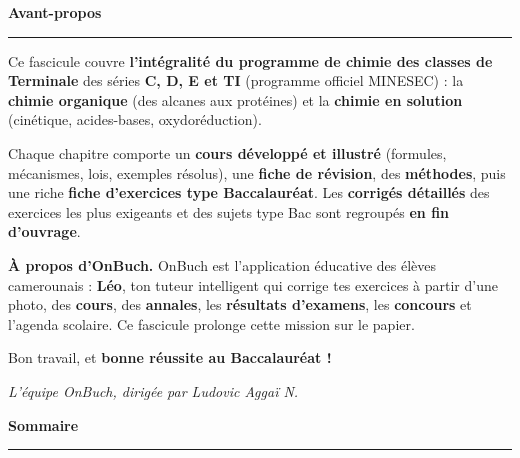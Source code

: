 





\frontmatter

\thispagestyle{empty}
\vspace*{0.6cm}
{\sffamily\fontsize{30}{32}\selectfont\bfseries\color{onbink} Avant-propos}\par\vspace{4pt}
{\color{onbo}\rule{5cm}{2.5pt}}\par\vspace{16pt}

\noindent Ce fascicule couvre \textbf{l'intégralité du programme de chimie des classes
de Terminale} des séries \textbf{C, D, E et TI} (programme officiel MINESEC) : la
\textbf{chimie organique} (des alcanes aux protéines) et la \textbf{chimie en
solution} (cinétique, acides-bases, oxydoréduction).

\medskip
\noindent Chaque chapitre comporte un \textbf{cours développé et illustré} (formules,
mécanismes, lois, exemples résolus), une \textbf{fiche de révision}, des
\textbf{méthodes}, puis une riche \textbf{fiche d'exercices type Baccalauréat}. Les
\textbf{corrigés détaillés} des exercices les plus exigeants et des sujets type Bac
sont regroupés \textbf{en fin d'ouvrage}.

\vspace{6pt}
\begin{aretenir}
\textbf{À propos d'OnBuch.} OnBuch est l'application éducative des élèves
camerounais : \textbf{Léo}, ton tuteur intelligent qui corrige tes exercices à partir
d'une photo, des \textbf{cours}, des \textbf{annales}, les \textbf{résultats
d'examens}, les \textbf{concours} et l'agenda scolaire. Ce fascicule prolonge cette
mission sur le papier.
\end{aretenir}

\medskip
\noindent Bon travail, et \textbf{bonne réussite au Baccalauréat !}
\par\vspace{8pt}
\hfill{\sffamily\itshape\color{onbmuted} L'équipe OnBuch, dirigée par Ludovic Aggaï N.}
\clearpage

\thispagestyle{empty}
\vspace*{0.6cm}
{\sffamily\fontsize{30}{32}\selectfont\bfseries\color{onbink} Sommaire}\par\vspace{4pt}
{\color{onbo}\rule{5cm}{2.5pt}}\par\vspace{10pt}
{\hypersetup{linkcolor=onbink}\makeatletter{}\makeatother}

